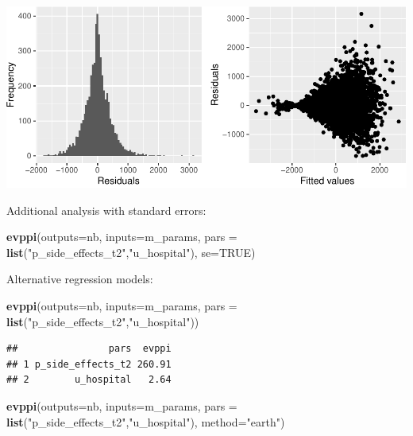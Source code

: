 \documentclass[
]{article}
\newenvironment{Shaded}{\begin{snugshade}}{\end{snugshade}}
\newcommand{\AttributeTok}[1]{\textcolor[rgb]{0.13,0.29,0.53}{#1}}
\newcommand{\ConstantTok}[1]{\textcolor[rgb]{0.56,0.35,0.01}{#1}}
\newcommand{\FunctionTok}[1]{\textcolor[rgb]{0.13,0.29,0.53}{\textbf{#1}}}
\newcommand{\NormalTok}[1]{#1}
\newcommand{\StringTok}[1]{\textcolor[rgb]{0.31,0.60,0.02}{#1}}
\begin{document}
\includegraphics{evppi_reg_files/figure-latex/regression_diagnostics-1.pdf}

Additional analysis with standard errors:

\begin{Shaded}
\begin{Highlighting}[]
\FunctionTok{evppi}\NormalTok{(}\AttributeTok{outputs=}\NormalTok{nb, }\AttributeTok{inputs=}\NormalTok{m\_params,}
      \AttributeTok{pars =} \FunctionTok{list}\NormalTok{(}\StringTok{"p\_side\_effects\_t2"}\NormalTok{,}\StringTok{"u\_hospital"}\NormalTok{), }\AttributeTok{se=}\ConstantTok{TRUE}\NormalTok{)}
\end{Highlighting}
\end{Shaded}

Alternative regression models:

\begin{Shaded}
\begin{Highlighting}[]
\FunctionTok{evppi}\NormalTok{(}\AttributeTok{outputs=}\NormalTok{nb, }\AttributeTok{inputs=}\NormalTok{m\_params,}
      \AttributeTok{pars =} \FunctionTok{list}\NormalTok{(}\StringTok{"p\_side\_effects\_t2"}\NormalTok{,}\StringTok{"u\_hospital"}\NormalTok{))}
\end{Highlighting}
\end{Shaded}

\begin{verbatim}
##                pars  evppi
## 1 p_side_effects_t2 260.91
## 2        u_hospital   2.64
\end{verbatim}

\begin{Shaded}
\begin{Highlighting}[]
\FunctionTok{evppi}\NormalTok{(}\AttributeTok{outputs=}\NormalTok{nb, }\AttributeTok{inputs=}\NormalTok{m\_params,}
      \AttributeTok{pars =} \FunctionTok{list}\NormalTok{(}\StringTok{"p\_side\_effects\_t2"}\NormalTok{,}\StringTok{"u\_hospital"}\NormalTok{),}
      \AttributeTok{method=}\StringTok{"earth"}\NormalTok{)}
\end{Highlighting}
\end{Shaded}
\end{document}
